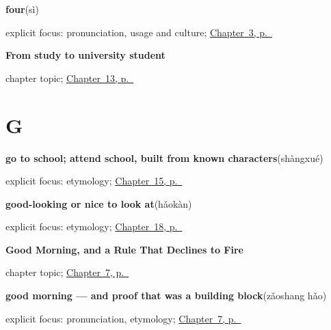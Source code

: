 \noindent\begin{minipage}[t]{\linewidth}
\raggedright
\textbf{four}\enspace\emph{}\enspace(sì)\par
\footnotesize explicit focus: pronunciation, usage and culture; \hyperref[ch:zh-numbers]{Chapter~3, p.~\pageref*{ch:zh-numbers}}
\end{minipage}\par\smallskip

\noindent\begin{minipage}[t]{\linewidth}
\raggedright
\textbf{From study to university student}\par
\footnotesize chapter topic; \hyperref[ch:zh-school-six]{Chapter~13, p.~\pageref*{ch:zh-school-six}}
\end{minipage}\par\smallskip

\section*{G}

\noindent\begin{minipage}[t]{\linewidth}
\raggedright
\textbf{go to school; attend school, built from known characters}\enspace\emph{}\enspace(shàngxué)\par
\footnotesize explicit focus: etymology; \hyperref[ch:zh-school-compounds]{Chapter~15, p.~\pageref*{ch:zh-school-compounds}}
\end{minipage}\par\smallskip

\noindent\begin{minipage}[t]{\linewidth}
\raggedright
\textbf{good-looking or nice to look at}\enspace\emph{}\enspace(hǎokàn)\par
\footnotesize explicit focus: etymology; \hyperref[ch:zh-looking-reading]{Chapter~18, p.~\pageref*{ch:zh-looking-reading}}
\end{minipage}\par\smallskip

\noindent\begin{minipage}[t]{\linewidth}
\raggedright
\textbf{Good Morning, and a Rule That Declines to Fire}\par
\footnotesize chapter topic; \hyperref[ch:zh-zaoshang]{Chapter~7, p.~\pageref*{ch:zh-zaoshang}}
\end{minipage}\par\smallskip

\noindent\begin{minipage}[t]{\linewidth}
\raggedright
\textbf{good morning — and proof that  was a building block}\enspace\emph{}\enspace(zǎoshang hǎo)\par
\footnotesize explicit focus: pronunciation, etymology; \hyperref[ch:zh-zaoshang]{Chapter~7, p.~\pageref*{ch:zh-zaoshang}}
\end{minipage}\par\smallskip

